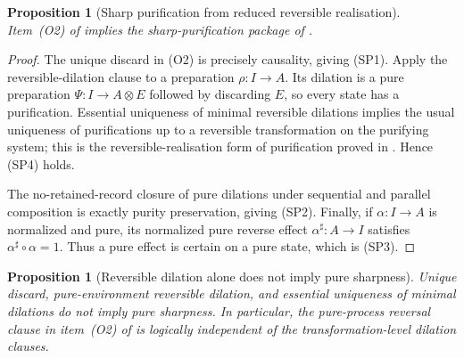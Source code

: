 \documentclass[11pt]{article}
\newtheorem{proposition}[theorem]{Proposition}
\theoremstyle{definition}
\theoremstyle{remark}
\begin{document}
\begin{proposition}[Sharp purification from reduced reversible realisation]
\label{prop:reversible-realisation-sharp-purification}
Item~\textup{(O2)} of  implies the
sharp-purification package of .
\end{proposition}

\begin{proof}
The unique discard in \textup{(O2)} is precisely causality, giving
\textup{(SP1)}.  Apply the reversible-dilation clause to a preparation
$\rho:I\to A$.  Its dilation is a pure preparation
$\Psi:I\to A\otimes E$ followed by discarding $E$, so every state has a
purification.  Essential uniqueness of minimal reversible dilations implies the
usual uniqueness of purifications up to a reversible transformation on the
purifying system; this is the reversible-realisation form of purification proved
in \cite{ChiribellaDAPS2009}.  Hence \textup{(SP4)} holds.

The no-retained-record closure of pure dilations under sequential and parallel
composition is exactly purity preservation, giving \textup{(SP2)}.  Finally, if
$\alpha:I\to A$ is normalized and pure, its normalized pure reverse effect
$\alpha^\sharp:A\to I$ satisfies
$\alpha^\sharp\circ\alpha=1$.  Thus a pure effect is certain on a pure state,
which is \textup{(SP3)}.
\end{proof}

\begin{proposition}[Reversible dilation alone does not imply pure sharpness]
\label{prop:dilation-does-not-imply-sharpness}
Unique discard, pure-environment reversible dilation, and essential uniqueness
of minimal dilations do not imply pure sharpness.  In particular, the
pure-process reversal clause in item~\textup{(O2)} of
 is logically independent of the
transformation-level dilation clauses.
\end{proposition}
\end{document}
